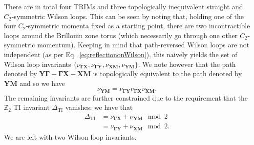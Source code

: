 There are in total four TRIMs and three topologically inequivalent straight and $C_2$-symmetric Wilson loops. This can be seen by noting that, holding one of the four $C_2$-symmetric momenta fixed as a starting point, there are two incontractible loops around the Brillouin zone torus (which necessarily go through one other $C_2$-symmetric momentum). Keeping in mind that path-reversed Wilson loops are not independent (as per Eq.~\eqref{eq:reflectiononWilson}), this naively yields the set of Wilson loop invariants $\{\nu_{\mathbf{\Gamma X}}, \nu_{\mathbf{\Gamma Y}}, \nu_{\mathbf{X M}}, \nu_{\mathbf{Y M}}\}$. We note however that the path denoted by $\mathbf{Y \Gamma} - \mathbf{\Gamma X} - \mathbf{XM}$ is topologically equivalent to the path denoted by $\mathbf{Y M}$ and so we have
\begin{equation}
\nu_{\mathbf{Y M}} = \nu_{\mathbf{\Gamma Y}} \nu_{\mathbf{\Gamma X}} \nu_{\mathbf{X M}}.
\end{equation}
The remaining invariants are further constrained due to the requirement that the $\mathbb{Z}_2$ TI invariant $\Delta_{\mathrm{TI}}$ vanishes: we have that
\begin{equation}
\begin{aligned}
\Delta_{\mathrm{TI}} & = \nu_{\mathbf{\Gamma X}} + \nu_{\mathbf{Y M}} \mod 2 \\
& = \nu_{\mathbf{\Gamma Y}} + \nu_{\mathbf{X M}} \mod 2.
\end{aligned}
\end{equation}
We are left with two Wilson loop invariants.

